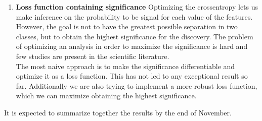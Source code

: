 \documentclass[11pt]{article}
\begin{document}
\begin{enumerate}
\item {\bf Loss function containing significance}
Optimizing the crossentropy lets us make inference on the probability to be signal for each value of the features. However, the goal is not to have the greatest possible separation in two classes, but to obtain the highest significance for the discovery. The problem of optimizing an analysis in order to maximize the significance is hard and few studies are present in the scientific literature.\\
The most naive approach is to make the significance differentiable and optimize it as a loss function. This has not led to any exceptional result so far.
Additionally we are also trying to implement a more robust loss function, which we can maximize obtaining the highest significance.

\end{enumerate}

It is expected to summarize together the results by the end of November.
\end{document}
